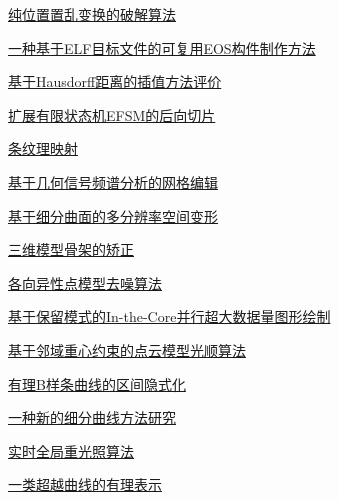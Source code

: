 \documentclass[a4paper]{article}
\begin{document}
\href{http://www.jos.org.cn/ch/reader/download_pdf.aspx?file_no=2004s119&year_id=2004&quarter_id=zk&falg=1}{纯位置置乱变换的破解算法}

\href{http://www.jos.org.cn/ch/reader/download_pdf.aspx?file_no=2004s120&year_id=2004&quarter_id=zk&falg=1}{一种基于ELF目标文件的可复用EOS构件制作方法}

\href{http://www.jos.org.cn/ch/reader/download_pdf.aspx?file_no=2004s121&year_id=2004&quarter_id=zk&falg=1}{基于Hausdorff距离的插值方法评价}

\href{http://www.jos.org.cn/ch/reader/download_pdf.aspx?file_no=2004s122&year_id=2004&quarter_id=zk&falg=1}{扩展有限状态机EFSM的后向切片}

\href{http://www.jos.org.cn/ch/reader/download_pdf.aspx?file_no=2004s123&year_id=2004&quarter_id=zk&falg=1}{条纹理映射}

\href{http://www.jos.org.cn/ch/reader/download_pdf.aspx?file_no=2004s124&year_id=2004&quarter_id=zk&falg=1}{基于几何信号频谱分析的网格编辑}

\href{http://www.jos.org.cn/ch/reader/download_pdf.aspx?file_no=2004s125&year_id=2004&quarter_id=zk&falg=1}{基于细分曲面的多分辨率空间变形}

\href{http://www.jos.org.cn/ch/reader/download_pdf.aspx?file_no=2004s126&year_id=2004&quarter_id=zk&falg=1}{三维模型骨架的矫正}

\href{http://www.jos.org.cn/ch/reader/download_pdf.aspx?file_no=2004s127&year_id=2004&quarter_id=zk&falg=1}{各向异性点模型去噪算法}

\href{http://www.jos.org.cn/ch/reader/download_pdf.aspx?file_no=2004s128&year_id=2004&quarter_id=zk&falg=1}{基于保留模式的In-the-Core并行超大数据量图形绘制}

\href{http://www.jos.org.cn/ch/reader/download_pdf.aspx?file_no=2004s129&year_id=2004&quarter_id=zk&falg=1}{基于邻域重心约束的点云模型光顺算法}

\href{http://www.jos.org.cn/ch/reader/download_pdf.aspx?file_no=2004s130&year_id=2004&quarter_id=zk&falg=1}{有理B样条曲线的区间隐式化}

\href{http://www.jos.org.cn/ch/reader/download_pdf.aspx?file_no=2004s131&year_id=2004&quarter_id=zk&falg=1}{一种新的细分曲线方法研究}

\href{http://www.jos.org.cn/ch/reader/download_pdf.aspx?file_no=2004s132&year_id=2004&quarter_id=zk&falg=1}{实时全局重光照算法}

\href{http://www.jos.org.cn/ch/reader/download_pdf.aspx?file_no=2004s133&year_id=2004&quarter_id=zk&falg=1}{一类超越曲线的有理表示}
\end{document}
